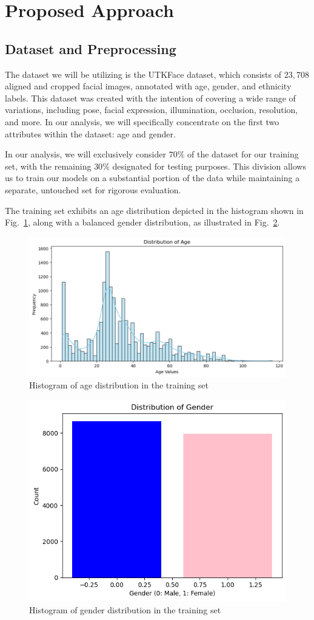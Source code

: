 \section{Proposed Approach} \label{sec:approach}
 
\subsection{Dataset and Preprocessing} \label{sec:dataset}

The dataset we will be utilizing is the UTKFace dataset,
which consists of $23,708$ aligned and cropped facial images, 
annotated with age, gender, and ethnicity labels.
This dataset was created with the intention of covering
a wide range of variations, including pose, facial expression,
illumination, occlusion, resolution, and more.
In our analysis, we will specifically concentrate
on the first two attributes within the dataset: age and gender. 

In our analysis, we will exclusively consider $70\%$
of the dataset for our training set, with the remaining
$30\%$ designated for testing purposes.
This division allows us to train our models on a substantial
portion of the data while maintaining a separate,
untouched set for rigorous evaluation.

The training set exhibits an age distribution depicted
in the histogram
shown in Fig.~\ref{1age}, along with a balanced gender distribution,
as illustrated in Fig.~\ref{2gender1}.

\begin{figure}[htbp]
    \centerline{\includegraphics[width=.5\textwidth]{images/dataset/age.png}}
    \caption{Histogram of age distribution in the training set}
    \label{1age}
\end{figure}

\begin{figure}[htbp]
    \centerline{\includegraphics[width=.4\textwidth]{images/dataset/gender1.png}}
    \caption{Histogram of gender distribution in the training set}
    \label{2gender1}
\end{figure}


